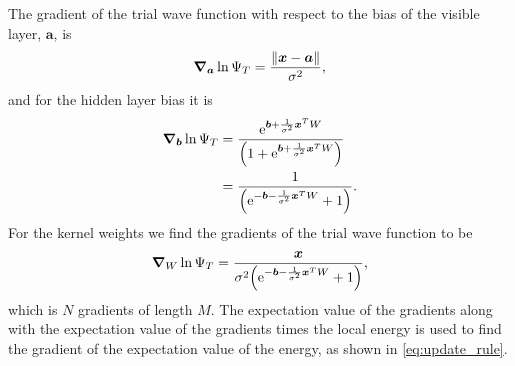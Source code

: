 The gradient of the trial wave function with respect to the bias of the visible layer, $\bm{a}$, is 
\begin{equation}
    \grad_{\bm{a}}\ln{\Psi_T} = \frac{\norm{\bm{x}-\bm{a}}}{\sigma^2}, 
\end{equation}
and for the hidden layer bias it is 
\begin{align}
    \grad_{\bm{b}}\ln{\Psi_T} &= \frac{\mathrm{e}^{\bm{b} + \frac{1}{\sigma^2}\bm{x}^T W}}{\qty(1+\mathrm{e}^{\bm{b} + \frac{1}{\sigma^2}\bm{x}^T W})} \\
    &= \frac{1}{\qty(\mathrm{e}^{-\bm{b} - \frac{1}{\sigma^2}\bm{x}^T W}+1)}. 
\end{align}
For the kernel weights we find the gradients of the trial wave function to be 
\begin{equation}
    \grad_{W}\ln{\Psi_T} = \frac{\bm{x}}{\sigma^2\qty(\mathrm{e}^{-\bm{b}-\frac{1}{\sigma^2}\bm{x}^T W}+1)}, 
\end{equation}
which is $N$ gradients of length $M$. The expectation value of the gradients along with the expectation value of the gradients times the local energy is used to find the gradient of the expectation value of the energy, as shown in \autoref{eq:update_rule}.